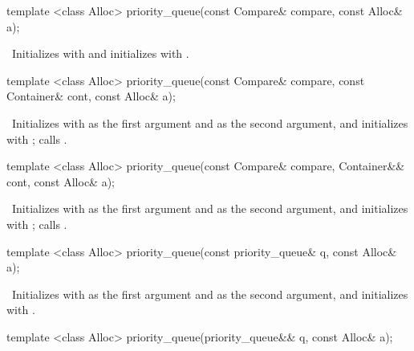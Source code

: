 %
\begin{itemdecl}
template <class Alloc> priority_queue(const Compare& compare, const Alloc& a);
\end{itemdecl}

\begin{itemdescr}
\pnum
\effects\ Initializes  with  and initializes  with .
\end{itemdescr}

%
\begin{itemdecl}
template <class Alloc>
  priority_queue(const Compare& compare, const Container& cont, const Alloc& a);
\end{itemdecl}

\begin{itemdescr}
\pnum
\effects\ Initializes  with  as the first argument and  as the second
argument, and initializes  with ;
calls .
\end{itemdescr}

%
\begin{itemdecl}
template <class Alloc>
  priority_queue(const Compare& compare, Container&& cont, const Alloc& a);
\end{itemdecl}

\begin{itemdescr}
\pnum
\effects\ Initializes  with  as the first argument and 
as the second argument, and initializes  with ;
calls .
\end{itemdescr}

%
\begin{itemdecl}
template <class Alloc> priority_queue(const priority_queue& q, const Alloc& a);
\end{itemdecl}

\begin{itemdescr}
\pnum
\effects\ Initializes  with  as the first argument and  as
the second argument, and initializes  with .
\end{itemdescr}

%
\begin{itemdecl}
template <class Alloc> priority_queue(priority_queue&& q, const Alloc& a);
\end{itemdecl}


